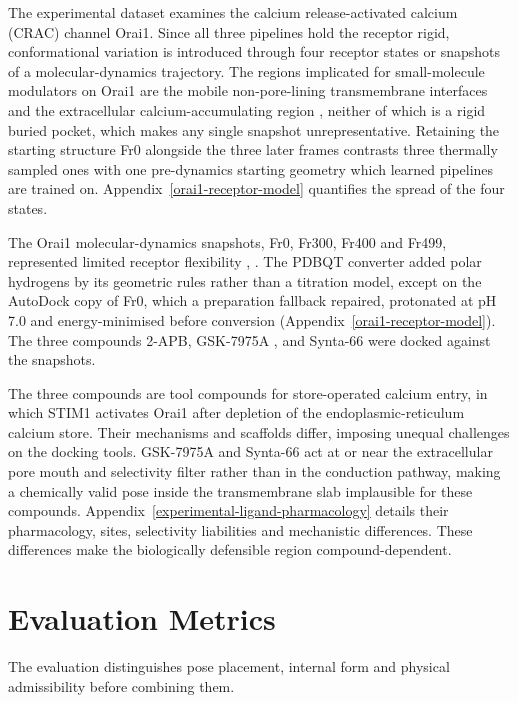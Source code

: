 The experimental dataset examines the calcium release-activated calcium (CRAC) channel Orai1. Since all three pipelines hold the receptor rigid, conformational variation is introduced through four receptor states or snapshots of a molecular-dynamics trajectory. The regions implicated for small-molecule modulators on Orai1 are the mobile non-pore-lining transmembrane interfaces \cite{ref072} and the extracellular calcium-accumulating region \cite{ref038}, neither of which is a rigid buried pocket, which makes any single snapshot unrepresentative. Retaining the starting structure Fr0 alongside the three later frames contrasts three thermally sampled ones with one pre-dynamics starting geometry which learned pipelines are trained on. Appendix~\ref{orai1-receptor-model} quantifies the spread of the four states. 

The Orai1 molecular-dynamics snapshots, Fr0, Fr300, Fr400 and Fr499, represented limited receptor flexibility \cite{ref038}, \cite{ref072}. The PDBQT converter added polar hydrogens by its geometric rules rather than a titration model, except on the AutoDock copy of Fr0, which a preparation fallback repaired, protonated at pH 7.0 and energy-minimised before conversion (Appendix~\ref{orai1-receptor-model}). The three compounds 2-APB, GSK-7975A \cite{ref041}, \cite{ref070} and Synta-66 \cite{ref071} were docked against the snapshots.

The three compounds are tool compounds for store-operated calcium entry, in which STIM1 activates Orai1 after depletion of the endoplasmic-reticulum calcium store. Their mechanisms and scaffolds differ, imposing unequal challenges on the docking tools. GSK-7975A and Synta-66 act at or near the extracellular pore mouth and selectivity filter rather than in the conduction pathway, making a chemically valid pose inside the transmembrane slab implausible for these compounds. Appendix~\ref{experimental-ligand-pharmacology} details their pharmacology, sites, selectivity liabilities and mechanistic differences. These differences make the biologically defensible region compound-dependent.

\hypertarget{evaluation-metrics}{%
\section{Evaluation Metrics}\label{evaluation-metrics}}

The evaluation distinguishes pose placement, internal form and physical admissibility before combining them.


